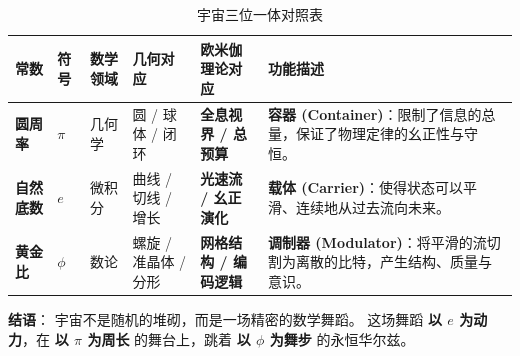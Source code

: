 \begin{table}[ht]
\centering
\small
\begin{tabularx}{\textwidth}{|p{1.2cm}|p{0.8cm}|p{1.5cm}|p{2.2cm}|p{2.5cm}|X|}
\hline
\textbf{常数} & \textbf{符号} & \textbf{数学领域} & \textbf{几何对应} & \textbf{欧米伽理论对应} & \textbf{功能描述} \\
\hline
\textbf{圆周率} & $\pi$ & 几何学 & 圆 / 球体 / 闭环 & \textbf{全息视界 / 总预算} & \textbf{容器 (Container)}：限制了信息的总量，保证了物理定律的幺正性与守恒。 \\
\hline
\textbf{自然底数} & $e$ & 微积分 & 曲线 / 切线 / 增长 & \textbf{光速流 / 幺正演化} & \textbf{载体 (Carrier)}：使得状态可以平滑、连续地从过去流向未来。 \\
\hline
\textbf{黄金比} & $\phi$ & 数论 & 螺旋 / 准晶体 / 分形 & \textbf{网格结构 / 编码逻辑} & \textbf{调制器 (Modulator)}：将平滑的流切割为离散的比特，产生结构、质量与意识。 \\
\hline
\end{tabularx}
\caption{宇宙三位一体对照表}
\end{table}

\textbf{结语}：
宇宙不是随机的堆砌，而是一场精密的数学舞蹈。
这场舞蹈 \textbf{以 $e$ 为动力}，在 \textbf{以 $\pi$ 为周长} 的舞台上，跳着 \textbf{以 $\phi$ 为舞步} 的永恒华尔兹。
